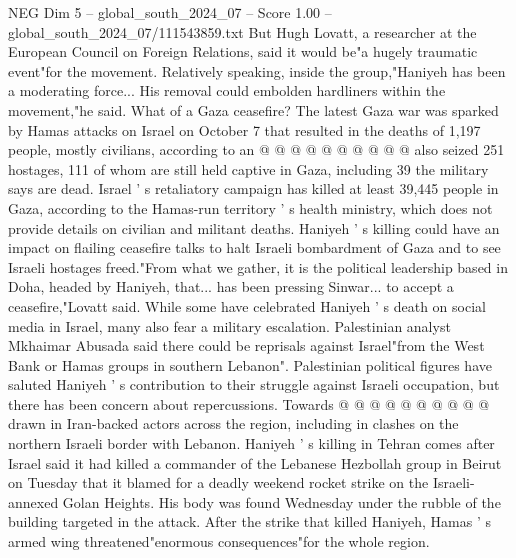 \begin{textsample}{NEG Dim 5 – global\_south\_2024\_07 – Score 1.00 – global\_south\_2024\_07/111543859.txt}
But Hugh Lovatt, a researcher at the European Council on Foreign Relations, said it would be"a hugely traumatic event"for the movement.
Relatively speaking, inside the group,"Haniyeh has been a moderating force...
His removal could embolden hardliners within the movement,"he said.
What of a Gaza ceasefire?
The latest Gaza war was sparked by Hamas attacks on Israel on October 7 that resulted in the deaths of 1,197 people, mostly civilians, according to an @ @ @ @ @ @ @ @ @ @ also seized 251 hostages, 111 of whom are still held captive in Gaza, including 39 the military says are dead.
Israel ' s retaliatory campaign has killed at least 39,445 people in Gaza, according to the Hamas-run territory ' s health ministry, which does not provide details on civilian and militant deaths.
Haniyeh ' s killing could have an impact on flailing ceasefire talks to halt Israeli bombardment of Gaza and to see Israeli hostages freed."From what we gather, it is the political leadership based in Doha, headed by Haniyeh, that... has been pressing Sinwar... to accept a ceasefire,"Lovatt said.
While some have celebrated Haniyeh ' s death on social media in Israel, many also fear a military escalation.
Palestinian analyst Mkhaimar Abusada said there could be reprisals against Israel"from the West Bank or Hamas groups in southern Lebanon".
Palestinian political figures have saluted Haniyeh ' s contribution to their struggle against Israeli occupation, but there has been concern about repercussions.
Towards @ @ @ @ @ @ @ @ @ @ drawn in Iran-backed actors across the region, including in clashes on the northern Israeli border with Lebanon.
Haniyeh ' s killing in Tehran comes after Israel said it had killed a commander of the Lebanese Hezbollah group in Beirut on Tuesday that it blamed for a deadly weekend rocket strike on the Israeli-annexed Golan Heights.
His body was found Wednesday under the rubble of the building targeted in the attack.
After the strike that killed Haniyeh, Hamas ' s armed wing threatened"enormous consequences"for the whole region.

\end{textsample}
